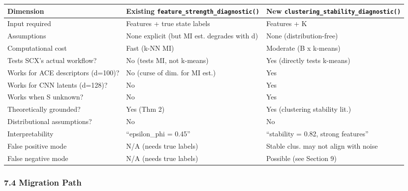 \documentclass[
  12pt,
]{ctexart}
\begin{document}
\begin{longtable}[]{@{}
  >{\raggedright\arraybackslash}p{}
  >{\raggedright\arraybackslash}p{}
  >{\raggedright\arraybackslash}p{}@{}}
\toprule\noalign{}
\begin{minipage}[b]{\linewidth}\raggedright
Dimension
\end{minipage} & \begin{minipage}[b]{\linewidth}\raggedright
Existing \texttt{feature\_strength\_diagnostic()}
\end{minipage} & \begin{minipage}[b]{\linewidth}\raggedright
New \texttt{clustering\_stability\_diagnostic()}
\end{minipage} \\
\midrule\noalign{}
\endhead
\bottomrule\noalign{}
\endlastfoot
Input required & Features + true state labels & Features + K \\
Assumptions & None explicit (but MI est. degrades with d) & None
(distribution-free) \\
Computational cost & Fast (k-NN MI) & Moderate (B x k-means) \\
Tests SCX's actual workflow? & No (tests MI, not k-means) & Yes
(directly tests k-means) \\
Works for ACE descriptors (d=100)? & No (curse of dim. for MI est.) &
Yes \\
Works for CNN latents (d=128)? & No & Yes \\
Works when S unknown? & No & Yes \\
Theoretically grounded? & Yes (Thm 2) & Yes (clustering stability
lit.) \\
Distributional assumptions? & No & No \\
Interpretability & ``epsilon\_phi = 0.45'' & ``stability = 0.82, strong
features'' \\
False positive mode & N/A (needs true labels) & Stable clus. may not
align with noise \\
False negative mode & N/A (needs true labels) & Possible (see Section
9) \\
\end{longtable}

\subsubsection{7.4 Migration Path}\label{migration-path}
\end{document}
